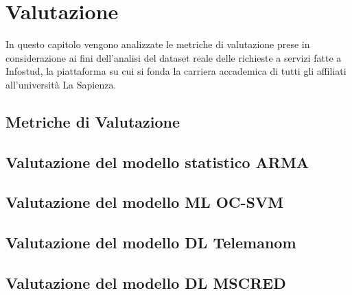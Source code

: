     

\chapter{Valutazione}
    In questo capitolo vengono analizzate le metriche di valutazione prese in considerazione ai fini 
    dell'analisi del dataset reale delle richieste a servizi fatte a Infostud, la piattaforma su cui si fonda 
    la carriera accademica di tutti gli affiliati all'università La Sapienza.

    \section{Metriche di Valutazione}
        

    \section{Valutazione del modello statistico ARMA}
        

    \section{Valutazione del modello ML OC-SVM}
        

    \section{Valutazione del modello DL Telemanom}
        
    \section{Valutazione del modello DL MSCRED}
        